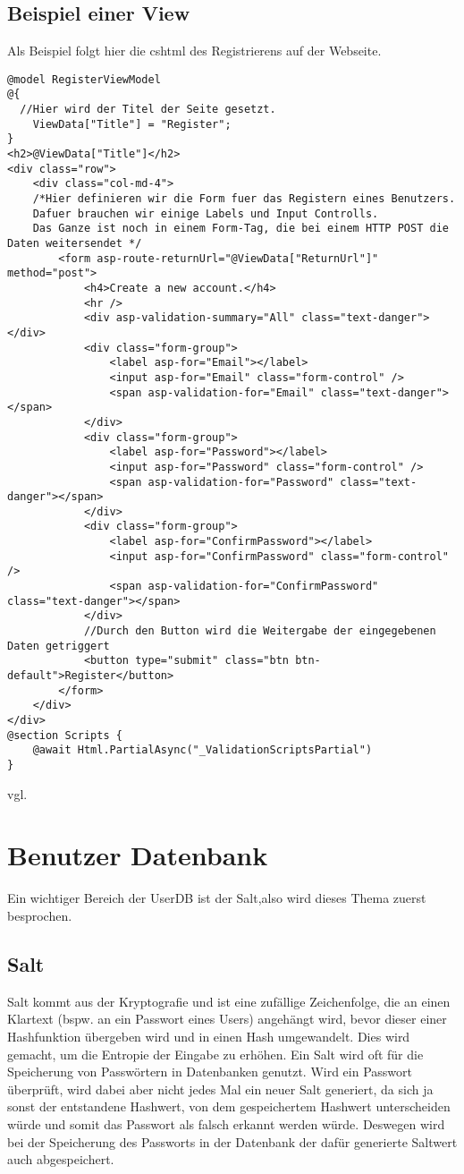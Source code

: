 {\subsection{Beispiel einer View}
\label{mvc_view_beispiel}
Als Beispiel folgt hier die cshtml des Registrierens auf der Webseite.
\begin{lstlisting}[caption={View Code example}]
@model RegisterViewModel
@{
  //Hier wird der Titel der Seite gesetzt.
    ViewData["Title"] = "Register";
}
<h2>@ViewData["Title"]</h2>
<div class="row">
    <div class="col-md-4">
    /*Hier definieren wir die Form fuer das Registern eines Benutzers.
    Dafuer brauchen wir einige Labels und Input Controlls. 
    Das Ganze ist noch in einem Form-Tag, die bei einem HTTP POST die Daten weitersendet */
        <form asp-route-returnUrl="@ViewData["ReturnUrl"]" method="post">
            <h4>Create a new account.</h4>
            <hr />
            <div asp-validation-summary="All" class="text-danger"></div>
            <div class="form-group">
                <label asp-for="Email"></label>
                <input asp-for="Email" class="form-control" />
                <span asp-validation-for="Email" class="text-danger"></span>
            </div>
            <div class="form-group">
                <label asp-for="Password"></label>
                <input asp-for="Password" class="form-control" />
                <span asp-validation-for="Password" class="text-danger"></span>
            </div>
            <div class="form-group">
                <label asp-for="ConfirmPassword"></label>
                <input asp-for="ConfirmPassword" class="form-control" />
                <span asp-validation-for="ConfirmPassword" class="text-danger"></span>
            </div>
            //Durch den Button wird die Weitergabe der eingegebenen Daten getriggert
            <button type="submit" class="btn btn-default">Register</button>
        </form>
    </div>
</div>
@section Scripts {
    @await Html.PartialAsync("_ValidationScriptsPartial")
}
\end{lstlisting}
vgl. \textcite{mic_views}
\section{Benutzer Datenbank}
\label{sec:UserDB}
Ein wichtiger Bereich der UserDB ist der Salt,also wird dieses Thema zuerst besprochen.
\subsection{Salt}
\label{sec:salt}
Salt kommt aus der Kryptografie und ist eine zufällige Zeichenfolge, die an einen Klartext (bspw. an ein Passwort eines Users) angehängt wird, bevor dieser einer Hashfunktion übergeben wird und in einen Hash umgewandelt. Dies wird gemacht, um die Entropie der Eingabe zu erhöhen. Ein Salt wird oft für die Speicherung von Passwörtern in Datenbanken genutzt. Wird ein Passwort überprüft, wird dabei aber nicht jedes Mal ein neuer Salt generiert, da sich ja sonst der entstandene Hashwert, von dem gespeichertem Hashwert unterscheiden würde und somit das Passwort als falsch erkannt werden würde. Deswegen wird bei der Speicherung des Passworts in der Datenbank der dafür generierte Saltwert auch abgespeichert.
}
